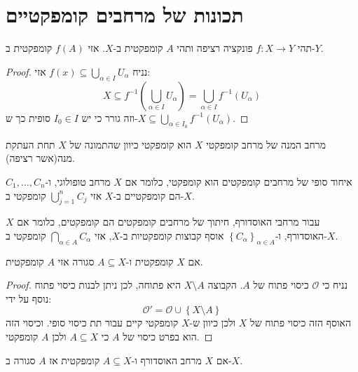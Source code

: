 \documentclass{tstextbook}
\begin{document}
\section{תכונות של מרחבים קומפקטיים}

\begin{proposition}
תהי \(f:X\to Y\) פונקציה רציפה ותהי \(A\) קומפקטית ב-\(X\). אזי \(f(A)\) קומפקטית ב-\(Y\).

\end{proposition}
\begin{proof}
נניח \(f(x)\subseteq \bigcup_{\alpha \in I}U_{\alpha}\) אזי:
$$X\subseteq f^{-1} \left( \bigcup_{\alpha \in I}U_{\alpha} \right)=\bigcup_{\alpha \in I}f^{-1} (U_{\alpha})$$
וזה גורר כי יש \(I_{0} \in I\) סופית כך ש-\(X\subseteq \bigcup_{{\alpha \in I_{0}}}f^{-1}(U_{\alpha})\).

\end{proof}
\begin{corollary}
מרחב המנה של מרחב קומפקטי \(X\) הוא קומפקטי כיוון שהתמונה של \(X\) תחת העתקת מנה(אשר רציפה).

\end{corollary}
\begin{proposition}
איחוד סופי של מרחבים קומפקטים הוא קומפקטי, כלומר אם \(X\) מרחב טופולוגי, ו-\(C_{1},\dots,C_{n}\) הם קומפקטיים ב-\(X\) אזי \(\bigcup_{j=1}^{n}C_{j}\) קומפקטי ב-\(X\). 

\end{proposition}
\begin{proposition}
עבור מרחבי האוסדורף, חיתוך של מרחבים קומפקטים הם קומפקטים, כלומר אם \(X\) האוסדורף, ו-\(\left\{  C_{\alpha}  \right\}_{\alpha \in A}\) אוסף קבוצות קומפקטיות ב-\(X\), אזי \(\bigcap_{\alpha \in A}C_{\alpha}\) קומפקטי ב-\(X\).

\end{proposition}
\begin{proposition}
אם \(X\) קומפקטית ו-\(A\subseteq X\) סגורה אזי \(A\) קומפקטית.

\end{proposition}
\begin{proof}
נניח כי \(\mathcal{O}\) כיסוי פתוח של \(A\). הקבוצה \(X\setminus A\) היא פתוחה, לכן ניתן לבנות כיסוי פתוח נוסף על ידי:
$$\mathcal{O} '=\mathcal{O}\cup \left\{  X\setminus A  \right\} $$
האוסף הזה כיסוי פתוח של \(X\) ולכן כיוון ש-\(X\) קומפקטי קיים עבור תת כיסוי סופי. וכיסוי הזה הוא בפרט כיסוי של \(A\) כי \(A\subseteq X\) ולכן \(A\) קומפקטי.

\end{proof}
\begin{proposition}
אם \(X\) מרחב האוסדורף ו-\(A\subseteq X\) קומפקטית אז \(A\) סגורה ב-\(X\).

\end{proposition}
\end{document}
